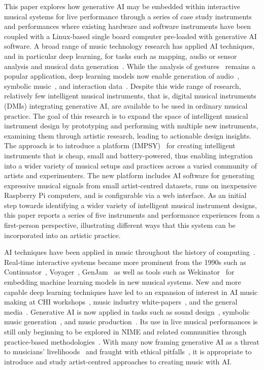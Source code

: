 \documentclass[sigconf]{nimeart}
\begin{document}
This paper explores how generative AI may be embedded within interactive musical systems for live performance through a series of case study instruments and performances where existing hardware and software instruments have been coupled with a Linux-based single board computer pre-loaded with generative AI software.
A broad range of music technology research has applied AI techniques, and in particular deep learning, for tasks such as mapping, audio or sensor analysis and musical data generation~\cite{jourdan_nime_ml_review}. 
While the analysis of gestures~\cite{visi_iml_gesture} remains a popular application, deep learning models now enable generation of audio~\cite{caillon_rave}, symbolic music~\cite{ji_survey_2024}, and interaction data~\cite{Martin2019}.
Despite this wide range of research, relatively few intelligent musical instruments, that is, digital musical instruments (DMIs) integrating generative AI, are available to be used in ordinary musical practice.
The goal of this research is to expand the space of intelligent musical instrument design by prototyping and performing with multiple new instruments, examining them through artistic research, leading to actionable design insights.
The approach is to introduce a platform (IMPSY)~\cite{impsy_software_zenodo} for creating intelligent instruments that is cheap, small and battery-powered, thus enabling integration into a wider variety of musical setups and practices across a varied community of artists and experimenters. 
The new platform includes AI software for generating expressive musical signals from small artist-centred datasets, runs on inexpensive Raspberry Pi computers, and is configurable via a web interface.
As an initial step towards identifying a wider variety of intelligent musical instrument designs, this paper reports a series of five instruments and performance experiences from a first-person perspective, illustrating different ways that this system can be incorporated into an artistic practice.

AI techniques have been applied in music throughout the history of computing~\cite{roads-music-AI-1985}. Real-time interactive systems became more prominent from the 1990s such as Continuator~\cite{Pachet:2003wd},  Voyager~\cite{Lewis:2000fu}, GenJam~\cite{Biles:2007aa} as well as tools such as Wekinator~\cite{fiebrink_meta-instrument_2009} for embedding machine learning models in new musical systems.
New and more capable deep learning techniques have led to an expansion of interest in AI music making at CHI workshops~\cite{genaichi2022}, music industry white-papers~\cite{goldmedia_ai_2024}, and the general media~\cite{musicpublishers}. Generative AI is now applied in tasks such as sound design~\cite{sound_design_ai_2024}, symbolic music generation~\cite{ji_survey_2024}, and music production~\cite{deruty_development_2022}. Its use in live musical performances is still only beginning to be explored in NIME and related communities through practice-based methodologies~\cite[e.g.,][]{privato-hauntography-2024, stefansdottir_intelligent_2025}.
With many now framing generative AI as a threat to musicians' livelihoods~\cite{goldmedia_ai_2024} and fraught with ethical pitfalls~\cite{ethical_genaudio_2023}, it is appropriate to introduce and study artist-centred approaches to creating music with AI.
\end{document}
